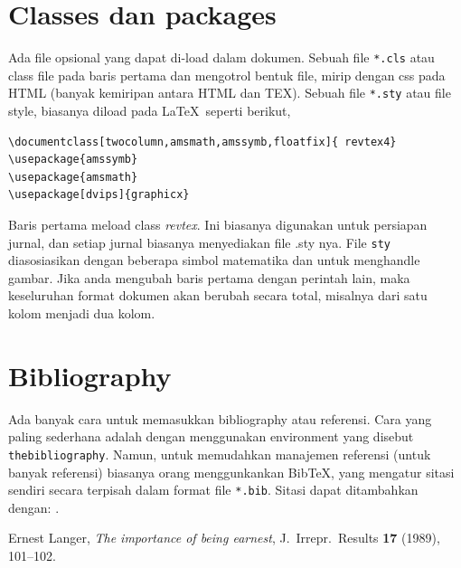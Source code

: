\documentclass[12pt]{article}
\begin{document}
\section{Classes dan packages}
Ada file opsional yang dapat di-load dalam dokumen. Sebuah file \texttt{*.cls} atau class file pada baris pertama dan mengotrol bentuk file, mirip dengan css pada HTML (banyak kemiripan antara HTML dan TEX). Sebuah file  \texttt{*.sty} atau file style, biasanya diload pada \LaTeX\ seperti berikut,
\begin{verbatim}
\documentclass[twocolumn,amsmath,amssymb,floatfix]{ revtex4}
\usepackage{amssymb}
\usepackage{amsmath}
\usepackage[dvips]{graphicx}
\end{verbatim}

Baris pertama meload class \textit{revtex}. Ini biasanya digunakan untuk persiapan jurnal, dan setiap jurnal biasanya menyediakan file .sty nya. File \texttt{sty} diasosiasikan dengan beberapa simbol matematika dan untuk menghandle gambar. Jika anda mengubah baris pertama dengan perintah lain, maka keseluruhan format dokumen akan berubah secara total, misalnya dari satu kolom menjadi dua kolom.

\section{Bibliography}
Ada banyak cara untuk memasukkan bibliography atau referensi. Cara yang paling sederhana adalah dengan menggunakan environment yang disebut \texttt{thebibliography}.  Namun, untuk memudahkan manajemen referensi (untuk banyak referensi) biasanya orang menggunkankan BibTeX, yang mengatur sitasi sendiri secara terpisah dalam format file \texttt{*.bib}.  Sitasi dapat ditambahkan dengan: \cite{langer1989}.

\begin{thebibliography}{9}

 Ernest Langer, \textit{The importance of being earnest}, J.\ Irrepr.\ Results \textbf{17} (1989), 101--102.

\end{thebibliography}
\end{document}
